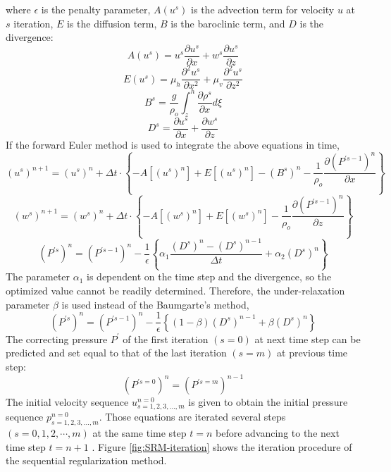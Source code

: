 where $\epsilon$ is the penalty parameter, $A(u^s)$ is the advection term for velocity $u$ at $s$ iteration, $E$ is the diffusion term, $B$ is the
baroclinic term, and $D$ is the divergence:
\begin{equation}
A(u^s)=u^s \frac {\partial u^s}{\partial x}+ w^s \frac {\partial
u^s}{\partial z}
\end{equation}
\begin{equation}
E(u^s)=\mu_h \frac {\partial^2 u^s}{\partial x^2}+\mu_v \frac
{\partial^2 u^s}{\partial z^2}
\end{equation}
\begin{equation}
B^s=\frac{g}{\rho_o}\int_z^h \frac{\partial \rho^s}{\partial x} d
\xi
\end{equation}
\begin{equation}
D^s=\frac {\partial u^s}{\partial x} + \frac {\partial
w^s}{\partial z}
\end{equation}
If the forward Euler method is used to integrate the above equations in time,
\begin {equation}
(u^s)^{n+1} = (u^{s})^{n}+ \Delta t \cdot \left\{
-A[(u^s)^n]+E[(u^s)^n]-(B^s)^n-\frac{1}{\rho_o}\frac{\partial
(P^{'s-1})^n}{\partial x} \right\}
\end{equation}
\begin {equation}
(w^s)^{n+1} = (w^s)^{n}+ \Delta t \cdot \left\{
-A[(w^s)^n]+E[(w^s)^n]-\frac{1}{\rho_o}\frac{\partial
(P^{'s-1})^n}{\partial z} \right\}
\end{equation}
\begin{equation}
(P^{'s})^n = (P^{'s-1})^{n} - \frac {1}{\epsilon} \left\{ \alpha_1
\frac { (D^s)^n -  (D^s)^{n-1} }{\Delta t}+ \alpha_2 (D^s)^n
\right\}
\end{equation}
The parameter $\alpha_1$ is dependent on the time step and the divergence, so the optimized value cannot be readily determined. Therefore, the under-relaxation parameter $\beta$ is used instead of the Baumgarte's method,
\begin{equation}
(P^{'s})^n = (P^{'s-1})^{n} - \frac {1}{\epsilon} \left\{
(1-\beta) (D^s)^{n-1}+ \beta (D^s)^n \right\}
\end{equation}
The correcting pressure $P^{'}$ of the first iteration $(s=0)$ at next time step can be predicted and set equal to that of the last iteration $(s=m)$ at previous time step:
\begin{equation}
(P^{'s=0})^n = (P^{'s=m})^{n-1}
\end{equation}
The initial velocity sequence $u_{s  = 1,2,3, \dots, m}^{n = 0}$ is given to obtain the initial pressure sequence $p_{s = 1,2,3, \dots, m}^{n= 0}$. Those equations are iterated several steps $(s=0,1,2, \cdots, m)$ at the same time step $t = n$ before advancing to the next time step $t= n+1$ . Figure \ref{fig:SRM-iteration} shows the iteration procedure of the sequential regularization method.

